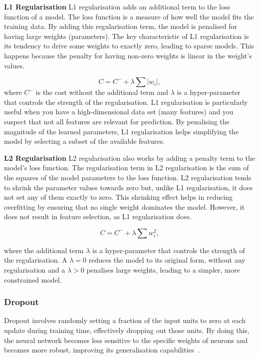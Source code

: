 \textbf{L1 Regularisation}
L1 regularisation adds an additional term to the loss function of a model. The loss function is a measure of how well the model fits the training data. By adding this regularisation term, the model is penalised for having large weights (parameters). The key characteristic of L1 regularisation is its tendency to drive some weights to exactly zero, leading to sparse models. This happens because the penalty for having non-zero weights is linear in the weight's values.
  
\begin{equation*}
   C = C^- + \lambda \sum |w_i|, 
\end{equation*}
where $C^-$ is the cost without the additional term and $\lambda$ is a hyper-parameter that controls the strength of the regularisation. L1 regularisation is particularly useful when you have a high-dimensional data set (many features) and you suspect that not all features are relevant for prediction. By penalising the magnitude of the learned parameters, L1 regularisation helps simplifying the model by selecting a subset of the available features.

\textbf{L2 Regularisation}
L2 regularisation also works by adding a penalty term to the model's loss function. The regularisation term in L2 regularisation is the sum of the squares of the model parameters to the loss function. L2 regularisation tends to shrink the parameter values towards zero but, unlike L1 regularisation, it does not set any of them exactly to zero. This shrinking effect helps in reducing overfitting by ensuring that no single weight dominates the model. However, it does not result in feature selection, as L1 regularisation does.
  
\begin{equation*}
   C = C^- + \lambda \sum w_i^2, 
\end{equation*}

where the additional term $\lambda$ is a hyper-parameter that controls the strength of the regularisation. A $\lambda=0$ reduces the model to its original form, without any regularisation and a $\lambda>0$ penalises large weights, leading to a simpler, more constrained model.

\subsubsection{Dropout}
Dropout involves randomly setting a fraction of the input units to zero at each update during training time, effectively dropping out those units. By doing this, the neural network becomes less sensitive to the specific weights of neurons and becomes more robust, improving its generalisation capabilities~\cite{srivastava2014dropout}.

